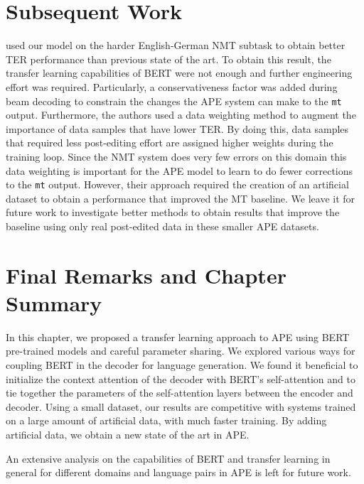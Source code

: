 \section{Subsequent Work}

\citet{lopes2019unbabels} used our model on the harder
English-German NMT subtask to obtain better TER performance than
previous state of the art. To obtain this result, the transfer
learning capabilities of BERT were not enough and further engineering
effort was required. Particularly, a conservativeness factor was
added during beam decoding to constrain the changes the APE system
can make to the {\tt mt} output. Furthermore, the authors used a data
weighting method to augment the importance of data samples that have
lower TER. By doing this, data samples that required less
post-editing effort are assigned higher weights during the training
loop. Since the NMT system does very few errors on this domain this
data weighting is important for the APE model to learn to do fewer
corrections to the {\tt mt} output. However, their approach required
the creation of an artificial dataset to obtain a performance that
improved the MT baseline. We leave it for future work to investigate
better methods to obtain results that improve the baseline using only
real post-edited data in these smaller APE datasets.

\section{Final Remarks and Chapter Summary}

In this chapter, we proposed a transfer learning approach to APE using
BERT pre-trained models and careful parameter sharing. We explored
various ways for coupling BERT in the decoder for language
generation. We found it beneficial to initialize the context
attention of the decoder with BERT's self-attention and to tie
together the parameters of the self-attention layers between the
encoder and decoder. Using a small dataset, our results are
competitive with systems trained on a large amount of artificial
data, with much faster training. By adding artificial data, we obtain
a new state of the art in APE.

An extensive analysis on the capabilities of BERT and transfer
learning in general for different domains and language pairs in APE
is left for future work.

\cleardoublepage
